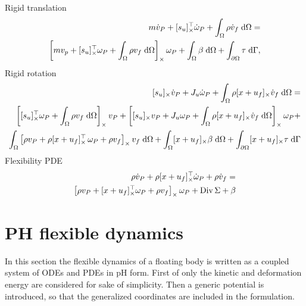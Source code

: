 Rigid translation
\begin{equation}
\label{eq:rig_tr2}
	\begin{split}
	m\dot{{v}}_P + \crmat{s_u}^\top \dot{{\omega}}_P +   \int_{\Omega} \rho \dot{v}_f \d{\Omega}  = \\
	\left[m v_p + \crmat{s_u}^\top \omega_P +\int_{\Omega} \rho v_f \d{\Omega} \right]_\times \omega_P +  \int_{\Omega} \beta \d{\Omega} + \int_{\partial \Omega} \tau \d{\Gamma}, 
	\end{split}
\end{equation}
Rigid rotation
\begin{equation}
\label{eq:rig_rot2}
\begin{split}
\crmat{s_u} \dot{{v}}_P  + J_u \dot{\omega}_P + \int_{\Omega} \rho \crmat{x+u_f} \dot{v}_f \d{\Omega} = \\
\left[\crmat{s_u}^\top \omega_P + \int_{\Omega} \rho {v}_f \d{\Omega} \right]_\times v_P + \left[\crmat{s_u}v_P + J_u \omega_P + \int_{\Omega} \rho \crmat{x+u_f} \dot{v}_f \d{\Omega} \right]_\times \omega_P + 
\\
\int_{\Omega} \left[\rho v_P + \rho \crmat{x+u_f}^\top \, \omega_P + \rho v_f \right]_\times v_f \d{\Omega} + \int_{\Omega}\crmat{x+u_f} \beta \d{\Omega} + \int_{\partial \Omega}\crmat{x+u_f} \tau \d{\Gamma}
\end{split}
\end{equation}
Flexibility PDE
\begin{equation}
\label{eq:flex2}
\begin{split}
\rho \dot{{v}}_P + \rho [x+u_f]_{\times}^\top \dot{\omega}_P  + \rho \dot{v}_f = \\
\left[\rho v_P + [x+u_f]_{\times}^\top \omega_P + \rho v_f \right]_\times \omega_P + \operatorname*{Div}{\Sigma} + \beta
\end{split}
\end{equation}


\section{PH flexible dynamics}
\label{sec:pH_fd}
In this section the flexible dynamics of a floating body is written as a coupled system of ODEs and PDEs in pH form. First of only the kinetic and deformation energy are considered for sake of simplicity. Then a generic potential is introduced, so that the generalized coordinates are included in the formulation. 


